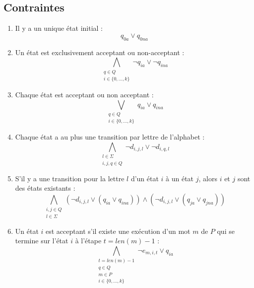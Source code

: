 \documentclass[a4paper, 12pt]{extarticle}
\begin{document}
\subsection{Contraintes} %
\label{sub:contraintes}

\begin{enumerate}
    \item Il y a un unique état initial :
    \begin{equation*}
        q_{0a} \vee q_{0na}
    \end{equation*}
    \item Un état est exclusivement acceptant ou non-acceptant :
    \begin{equation*}
        \bigwedge_{\substack{q\in Q \\ i\in \{0,\dots,k\}}} \neg q_{ia} \vee \neg q_{ina}
    \end{equation*}
    \item Chaque état est acceptant ou non acceptant :
    \begin{equation*}
        \bigvee_{\substack{q\in Q \\ i\in \{0,\dots,k\}}} q_{ia} \vee q_{ina}
    \end{equation*}
    \item Chaque état a au plus une transition par lettre de l'alphabet :
    \begin{equation*}
        \bigwedge_{\substack{l\in \Sigma\\i,j,q \in Q}}\neg d_{i,j,l} \vee \neg d_{i,q,l}
    \end{equation*}
    \item S'il y a une transition pour la lettre $l$ d'un état $i$ à un état $j$, alors 
    $i$ et $j$ sont des états existants :
    \begin{equation*}
        \bigwedge_{\substack{i,j \in Q\\l \in \Sigma}} (\neg d_{i,j,l} \vee (q_{ia}\vee q_{ina})) \wedge (\neg d_{i,j,l} \vee (q_{ja}\vee q_{jna}))
    \end{equation*}
    \item Un état $i$ est acceptant s'il existe une exécution d'un mot $m$ de $P$ qui se termine sur l'état $i$ à l'étape $t=len(m)-1$ :
    \begin{equation*}
        \bigwedge_{\substack{t=len(m)-1\\q \in Q\\ m \in P\\ i \in \{0,\dots,k\}}} \neg e_{m,i,t} \vee q_{ia}
    \end{equation*}

\end{enumerate}
\end{document}
